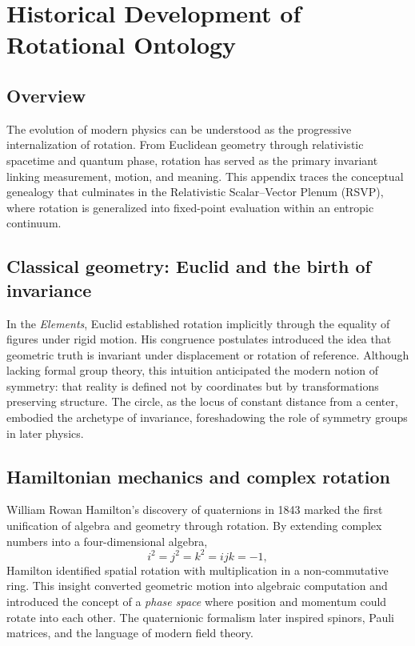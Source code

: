 \documentclass[12pt,a4paper]{article}
\newcommand{\RSVP}{RSVP}              %
\theoremstyle{plain}
\begin{document}
\section{Historical Development of Rotational Ontology}
\label{app:rotational-ontology}

\subsection{Overview}
The evolution of modern physics can be understood as the progressive internalization of rotation.  
From Euclidean geometry through relativistic spacetime and quantum phase, rotation has served as the primary invariant linking measurement, motion, and meaning.  
This appendix traces the conceptual genealogy that culminates in the Relativistic Scalar--Vector Plenum (\RSVP), where rotation is generalized into fixed-point evaluation within an entropic continuum.

\subsection{Classical geometry: Euclid and the birth of invariance}
In the \textit{Elements}, Euclid established rotation implicitly through the equality of figures under rigid motion.  
His congruence postulates introduced the idea that geometric truth is invariant under displacement or rotation of reference.  
Although lacking formal group theory, this intuition anticipated the modern notion of symmetry: that reality is defined not by coordinates but by transformations preserving structure.  
The circle, as the locus of constant distance from a center, embodied the archetype of invariance, foreshadowing the role of symmetry groups in later physics.

\subsection{Hamiltonian mechanics and complex rotation}
William Rowan Hamilton’s discovery of quaternions in 1843 marked the first unification of algebra and geometry through rotation.  
By extending complex numbers into a four-dimensional algebra,
\[
i^2=j^2=k^2=ijk=-1,
\]
Hamilton identified spatial rotation with multiplication in a non-commutative ring.
This insight converted geometric motion into algebraic computation and introduced the concept of a \emph{phase space} where position and momentum could rotate into each other.
The quaternionic formalism later inspired spinors, Pauli matrices, and the language of modern field theory.
\end{document}
